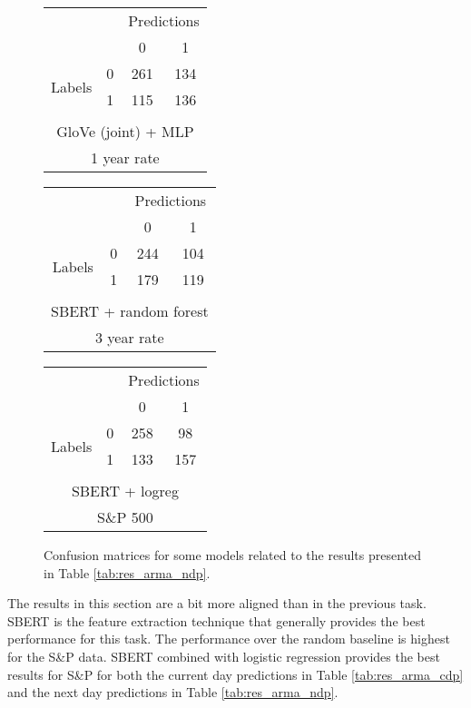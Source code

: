 \begin{figure}[!htb]
    \centering
    \begin{tabular}{cccc}
     & & \multicolumn{2}{c}{Predictions} \\
     & & \multicolumn{1}{|c|}{0} & \multicolumn{1}{c|}{1}\\
      \cline{2-4}
     \multirow{2}{*}{Labels} & 0 & \multicolumn{1}{|c|}{261} &  \multicolumn{1}{c|}{134} \\
      & 1 & \multicolumn{1}{|c|}{115} & \multicolumn{1}{c|}{136} \\ 
      \\ \multicolumn{4}{c}{GloVe (joint) + MLP} \\
      \multicolumn{4}{c}{1 year rate}
\end{tabular} \hspace{1em}
\begin{tabular}{cccc}
     & & \multicolumn{2}{c}{Predictions} \\
     & & \multicolumn{1}{|c|}{0} & \multicolumn{1}{c|}{1}\\
      \cline{2-4}
     \multirow{2}{*}{Labels} & 0 & \multicolumn{1}{|c|}{244} &  \multicolumn{1}{c|}{104} \\
      & 1 & \multicolumn{1}{|c|}{179} & \multicolumn{1}{c|}{119} \\ 
      \\ \multicolumn{4}{c}{SBERT + random forest} \\
      \multicolumn{4}{c}{3 year rate}
\end{tabular} \hspace{1em}
\begin{tabular}{cccc}
     & & \multicolumn{2}{c}{Predictions} \\
     & & \multicolumn{1}{|c|}{0} & \multicolumn{1}{c|}{1} \\
      \cline{2-4}
     \multirow{2}{*}{Labels} & 0 & \multicolumn{1}{|c|}{258} &  \multicolumn{1}{c|}{98} \\
      & 1 & \multicolumn{1}{|c|}{133} & \multicolumn{1}{c|}{157} \\ 
      \\ \multicolumn{4}{c}{SBERT + logreg} \\
      \multicolumn{4}{c}{S\&P 500}
\end{tabular}
    \caption{Confusion matrices for some models related to the results presented in Table \ref{tab:res_arma_ndp}.}
    \label{tab:confmat_arma_ndp}
\end{figure}

The results in this section are a bit more aligned than in the previous task. SBERT is the feature extraction technique that generally provides the best performance for this task. The performance over the random baseline is highest for the S\&P data. SBERT combined with logistic regression provides the best results for S\&P for both the current day predictions in Table \ref{tab:res_arma_cdp} and the next day predictions in Table \ref{tab:res_arma_ndp}. 



